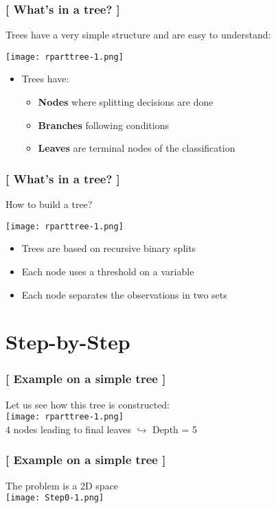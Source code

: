 \documentclass[xcolor=x11names,compress, handhouts]{beamer}
\renewcommand{\(}{\begin{columns}}
\renewcommand{\)}{\end{columns}}
\newcommand{\<}[1]{\begin{column}{#1}}
\renewcommand{\>}{\end{column}}
\begin{document}
\begin{frame} %
\frametitle{\textcolor{brique}{[ What's in a tree? ]}}
Trees have a very simple structure and are easy to understand:
\begin{center} \texttt{[image: rparttree-1.png]} \end{center}
\pause
\begin{itemize}
  \item[] Trees have:
  \begin{itemize}[<+->]
    \item \textbf{Nodes} where splitting decisions are done
    \item \textbf{Branches}  following conditions
    \item \textbf{Leaves} are terminal nodes of the classification
  \end{itemize}
\end{itemize}
\end{frame}


\begin{frame}
\frametitle{\textcolor{brique}{[ What's in a tree? ]}}
How to build a tree?
\begin{center} \texttt{[image: rparttree-1.png]} \end{center}
\pause
\begin{itemize}
    \item Trees are based on recursive binary splits
    \item Each node uses a threshold on a variable
    \item Each node separates the observations in two sets
\end{itemize}
\end{frame}


\section{Step-by-Step}

\begin{frame}
\frametitle{\textcolor{brique}{[ Example on a simple tree ]}}
Let us see how this tree is constructed:\\
\texttt{[image: rparttree-1.png]} \\
4 nodes leading to final leaves $\hookrightarrow$  Depth = 5
\end{frame}

\begin{frame}
\frametitle{\textcolor{brique}{[ Example on a simple tree ]}}
The problem is a 2D space\\
\texttt{[image: Step0-1.png]}
\end{frame}
\end{document}
